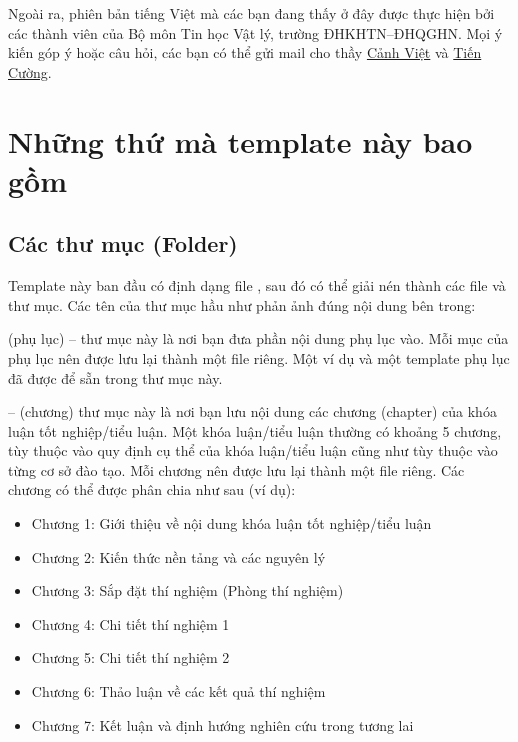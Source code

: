 Ngoài ra, phiên bản tiếng Việt mà các bạn đang thấy ở đây được thực hiện bởi các thành viên của Bộ môn Tin học Vật lý, trường ĐHKHTN--ĐHQGHN. Mọi ý kiến góp ý hoặc câu hỏi, các bạn có thể gửi mail cho thầy \href{mailto:vietncp@gmail.com }{Cảnh Việt} và \href{mailto:ngtiencuong@gmail.com }{Tiến Cường}.



\section{Những thứ mà template này bao gồm}

\subsection{Các thư mục (Folder)}

Template này ban đầu có định dạng file , sau đó có thể giải nén thành các file và thư mục. Các tên của thư mục hầu như phản ảnh đúng nội dung bên trong:

 (phụ lục) -- thư mục này là nơi bạn đưa phần nội dung phụ lục vào. Mỗi mục của phụ lục nên được lưu lại thành một file  riêng. Một ví dụ và một template phụ lục đã được để sẵn trong thư mục này.

 -- (chương) thư mục này là nơi bạn lưu nội dung các chương (chapter) của khóa luận tốt nghiệp/tiểu luận. Một khóa luận/tiểu luận thường có khoảng 5 chương, tùy thuộc vào quy định cụ thể của khóa luận/tiểu luận cũng như tùy thuộc vào từng cơ sở đào tạo. Mỗi chương nên được lưu lại thành một file  riêng. Các chương có thể được phân chia như sau (ví dụ):
\begin{itemize}
	\item Chương 1: Giới thiệu về nội dung khóa luận tốt nghiệp/tiểu luận
	\item Chương 2: Kiến thức nền tảng và các nguyên lý
	\item Chương 3: Sắp đặt thí nghiệm (Phòng thí nghiệm)
	\item Chương 4: Chi tiết thí nghiệm 1
	\item Chương 5: Chi tiết thí nghiệm 2
	\item Chương 6: Thảo luận về các kết quả thí nghiệm
	\item Chương 7: Kết luận và định hướng nghiên cứu trong tương lai
\end{itemize}

